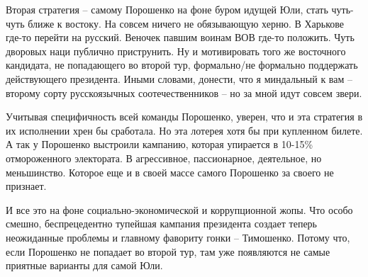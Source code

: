 Вторая стратегия – самому Порошенко на фоне буром идущей Юли, стать чуть-чуть
ближе к востоку. На совсем ничего не обязывающую херню. В Харькове где-то
перейти на русский. Веночек павшим воинам ВОВ где-то положить. Чуть дворовых
наци публично приструнить. Ну и мотивировать того же восточного кандидата, не
попадающего во второй тур, формально/не формально поддержать действующего
президента. Иными словами, донести, что я миндальный к вам – второму сорту
русскоязычных соотечественников – но за мной идут совсем звери.

Учитывая специфичность всей команды Порошенко, уверен, что и эта стратегия в их
исполнении хрен бы сработала. Но эта лотерея хотя бы при купленном билете. А
так у Порошенко выстроили кампанию, которая упирается в 10-15\% отмороженного
электората. В агрессивное, пассионарное, деятельное, но меньшинство. Которое
еще и в своей массе самого Порошенко за своего не признает.

И все это на фоне социально-экономической и коррупционной жопы. Что особо
смешно, беспрецедентно тупейшая кампания президента создает теперь неожиданные
проблемы и главному фавориту гонки – Тимошенко. Потому что, если Порошенко не
попадает во второй тур, там уже появляются не самые приятные варианты для самой
Юли.

